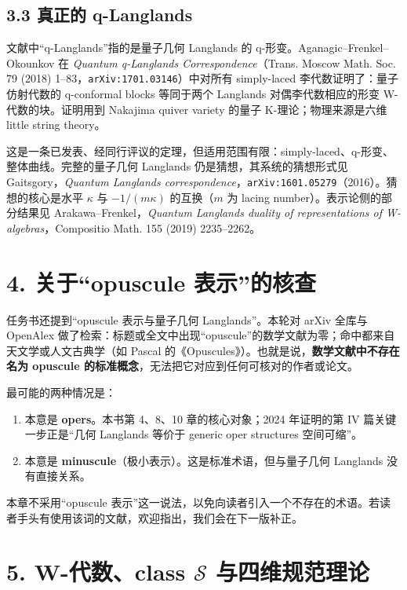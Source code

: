 \subsection*{3.3 真正的 q-Langlands}

文献中“q-Langlands”指的是量子几何 Langlands 的 q-形变。Aganagic--Frenkel--Okounkov 在 \emph{Quantum q-Langlands Correspondence}（Trans. Moscow Math. Soc. 79 (2018) 1--83，\texttt{arXiv:1701.03146}）中对所有 simply-laced 李代数证明了：量子仿射代数的 q-conformal blocks 等同于两个 Langlands 对偶李代数相应的形变 W-代数的块。证明用到 Nakajima quiver variety 的量子 K-理论；物理来源是六维 little string theory。

这是一条已发表、经同行评议的定理，但适用范围有限：simply-laced、q-形变、整体曲线。完整的量子几何 Langlands 仍是猜想，其系统的猜想形式见 Gaitsgory，\emph{Quantum Langlands correspondence}，\texttt{arXiv:1601.05279}（2016）。猜想的核心是水平 $\kappa$ 与 $-1/(m\kappa)$ 的互换（$m$ 为 lacing number）。表示论侧的部分结果见 Arakawa--Frenkel，\emph{Quantum Langlands duality of representations of W-algebras}，Compositio Math. 155 (2019) 2235--2262。

\section*{4. 关于“opuscule 表示”的核查}

任务书还提到“opuscule 表示与量子几何 Langlands”。本轮对 arXiv 全库与 OpenAlex 做了检索：标题或全文中出现“opuscule”的数学文献为零；命中都来自天文学或人文古典学（如 Pascal 的《Opuscules》）。也就是说，\textbf{数学文献中不存在名为 opuscule 的标准概念}，无法把它对应到任何可核对的作者或论文。

最可能的两种情况是：
\begin{enumerate}
\item 本意是 \textbf{opers}。本书第 4、8、10 章的核心对象；2024 年证明的第 IV 篇关键一步正是“几何 Langlands 等价于 generic oper structures 空间可缩”。
\item 本意是 \textbf{minuscule}（极小表示）。这是标准术语，但与量子几何 Langlands 没有直接关系。
\end{enumerate}
本章不采用“opuscule 表示”这一说法，以免向读者引入一个不存在的术语。若读者手头有使用该词的文献，欢迎指出，我们会在下一版补正。

\section*{5. W-代数、class $\mathcal S$ 与四维规范理论}

